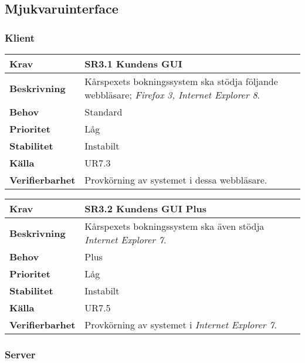 \documentclass[a4paper, twoside, 11pt, titlepage]{article}
\begin{document}
	\subsection{Mjukvaruinterface}



		\subsubsection{Klient}


		\begin{tabular} { p{2.6cm} p{12.5cm} }
			\hline
			\sffamily\textbf{Krav} & \sffamily\textbf{SR3.1 Kundens GUI } \\
			\hline
			\sffamily\textbf{Beskrivning} & Kårspexets bokningssystem ska stödja följande webbläsare; \emph{Firefox 3\underline{}, \emph{Internet Explorer 8}}.   \\
			\hline
			\sffamily\textbf{Behov} & Standard  \\
			\hline
			\sffamily\textbf{Prioritet} & Låg  \\
			\hline
			\sffamily\textbf{Stabilitet} & Instabilt  \\
			\hline
			\sffamily\textbf{Källa} & UR7.3  \\
			\hline
			\sffamily\textbf{Verifierbarhet} & Provkörning av systemet i dessa webbläsare.  \\
			\hline
		\end{tabular}
		\vspace{6mm}

		\begin{tabular} { p{2.6cm} p{12.5cm} }
			\hline
			\sffamily\textbf{Krav} & \sffamily\textbf{SR3.2 Kundens GUI Plus } \\
			\hline
			\sffamily\textbf{Beskrivning} & Kårspexets bokningssystem ska även stödja \emph{Internet Explorer 7}.  \\
			\hline
			\sffamily\textbf{Behov} & Plus  \\
			\hline
			\sffamily\textbf{Prioritet} & Låg  \\
			\hline
			\sffamily\textbf{Stabilitet} & Instabilt  \\
			\hline
			\sffamily\textbf{Källa} & UR7.5  \\
			\hline
			\sffamily\textbf{Verifierbarhet} & Provkörning av systemet i \emph{Internet Explorer 7}.  \\
			\hline
		\end{tabular}


		\subsubsection{Server}
\end{document}

